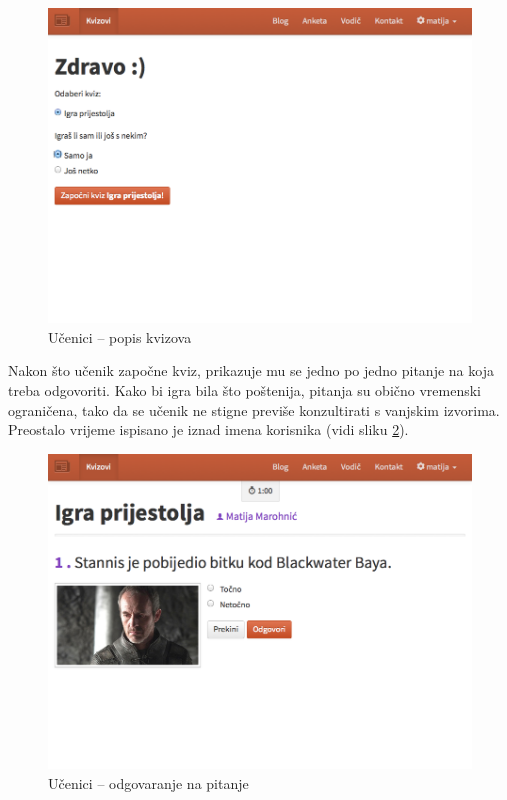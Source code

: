 \documentclass{scrreprt}
\begin{document}
\begin{figure}[H]
  \includegraphics[width=\textwidth, clip=true, trim=0 8.5cm 0 0, fbox]{student/quizzes}
  \caption{Učenici -- popis kvizova}
  \label{student/quizzes}
\end{figure}

Nakon što učenik započne kviz, prikazuje mu se jedno po jedno pitanje na koja
treba odgovoriti. Kako bi igra bila što poštenija, pitanja su obično vremenski
ograničena, tako da se učenik ne stigne previše konzultirati s vanjskim
izvorima. Preostalo vrijeme ispisano je iznad imena korisnika (vidi sliku
\ref{question}).

\begin{figure}[H]
  \includegraphics[width=\textwidth, clip=true, trim=0 7cm 0 0, fbox]{student/boolean_question}
  \caption{Učenici -- odgovaranje na pitanje}
  \label{question}
\end{figure}
\end{document}
